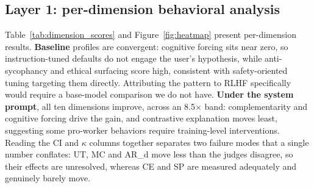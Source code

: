 \documentclass{article}
\begin{document}
\subsection{Layer 1: per-dimension behavioral analysis}

Table~\ref{tab:dimension_scores} and Figure~\ref{fig:heatmap} present per-dimension results. \textbf{Baseline} profiles are convergent: cognitive forcing sits near zero, so instruction-tuned defaults do not engage the user's hypothesis, while anti-sycophancy and ethical surfacing score high, consistent with safety-oriented tuning targeting them directly. Attributing the pattern to RLHF specifically would require a base-model comparison we do not have. \textbf{Under the system prompt}, all ten dimensions improve, across an 8.5$\times$ band: complementarity and cognitive forcing drive the gain, and contrastive explanation moves least, suggesting some pro-worker behaviors require training-level interventions. Reading the CI and $\kappa$ columns together separates two failure modes that a single number conflates: UT, MC and AR\_d move less than the judges disagree, so their effects are unresolved, whereas CE and SP are measured adequately and genuinely barely move.
\end{document}
